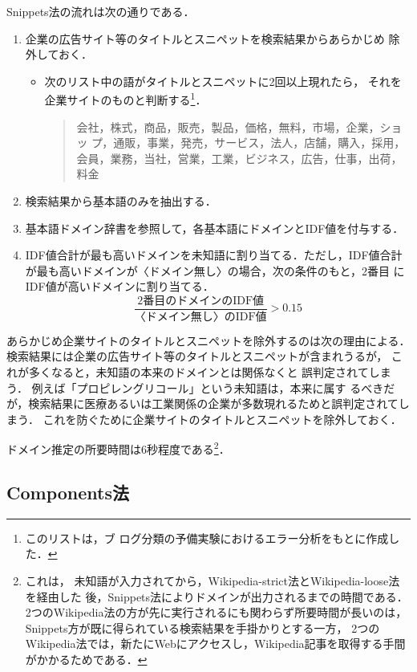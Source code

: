 \documentclass[japanese]{jnlp_1.4}
\newcommand{\dom}[1]{}
\begin{document}
Snippets法の流れは次の通りである．
\begin{enumerate}
 \item 企業の広告サイト等のタイトルとスニペットを検索結果からあらかじめ
       除外しておく．
       \begin{itemize}
	\item 次のリスト中の語がタイトルとスニペットに2回以上現れたら，
	      それを企業サイトのものと判断する\footnote{このリストは，ブ
	      ログ分類の予備実験におけるエラー分析をもとに作成した．}．
	      \begin{quote}
	       会社，株式，商品，販売，製品，価格，無料，市場，企業，ショッ
	       プ，通販，事業，発売，サービス，法人，店舗，購入，採用，
	       会員，業務，当社，営業，工業，ビジネス，広告，仕事，出荷，
	       料金
	      \end{quote}
       \end{itemize}
 \item 検索結果から基本語のみを抽出する．
 \item 基本語ドメイン辞書を参照して，各基本語にドメインとIDF値を付与する．
 \item IDF値合計が最も高いドメインを未知語に割り当てる．ただし，IDF値合計
       が最も高いドメインが〈ドメイン無し〉の場合，次の条件のもと，2番目
       にIDF値が高いドメインに割り当てる．
       $$\frac{\textrm{2番目のドメインのIDF値}}{\textrm{〈ドメイン無し〉のIDF値}}>0.15$$
\end{enumerate}

あらかじめ企業サイトのタイトルとスニペットを除外するのは次の理由による．
検索結果には企業の広告サイト等のタイトルとスニペットが含まれうるが，
これが多くなると，未知語の本来のドメインとは関係なく\dom{ビジネス}と
誤判定されてしまう．
例えば「プロピレングリコール」という未知語は，本来\dom{科学・技術}に属す
るべきだが，検索結果に医療あるいは工業関係の企業が多数現れるため\dom{ビ
ジネス}と誤判定されてしまう．
これを防ぐために企業サイトのタイトルとスニペットを除外しておく．

ドメイン推定の所要時間は6秒程度である\footnote{
これは，
未知語が入力されてから，Wikipedia-strict法とWikipedia-loose法を経由した
後，Snippets法によりドメインが出力されるまでの時間である．
2つのWikipedia法の方が先に実行されるにも関わらず所要時間が長いのは，
Snippets方が既に得られている検索結果を手掛かりとする一方，
2つのWikipedia法では，新たにWebにアクセスし，Wikipedia記事を取得する手間
がかかるためである．
}．


\subsection{Components法}
\end{document}
